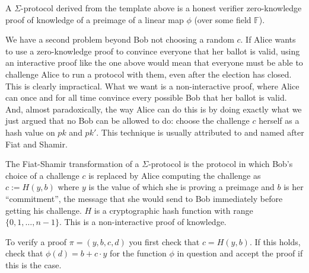 \documentclass[envcountsame]{llncs}
\begin{document}
\begin{proposition}
A $\Sigma$-protocol derived from the template above is a honest verifier zero-knowledge proof of knowledge of a preimage of a linear map $\phi$ (over
some field $\mathbb F$).
\end{proposition}


We have a second problem beyond Bob not choosing a random $c$. If Alice wants to
use a zero-knowledge proof to convince everyone that her ballot is valid, using
an interactive proof like the one above would mean that everyone must be able to
challenge Alice to run a protocol with them, even after the election has closed.
This is clearly impractical. What we want is a non-interactive proof, where
Alice can once and for all time convince every possible Bob that her ballot is
valid. And, almost paradoxically, the way Alice can do this is by doing exactly
what we just argued that no Bob can be allowed to do: choose the challenge $c$
herself as a hash value on $pk$ and $pk'$. This technique is usually attributed
to and named after Fiat and Shamir\footnotemark \cite{FS86}.

\begin{definition}
The Fiat-Shamir transformation of a $\Sigma$-protocol is the protocol in which
Bob's choice of a challenge $c$ is replaced by Alice computing the challenge as
$c := H(y, b)$ where $y$ is the value of which she is proving a preimage and $b$
is her ``commitment'', the message that she would send to Bob immediately before
getting his challenge. $H$ is a cryptographic hash function with range $\{0, 1,
\ldots, n-1\}$. This is a non-interactive proof of knowledge.

To verify a proof $\pi = (y, b, c, d)$ you first check that $c = H(y, b)$. If
this holds, check that $\phi(d) = b + c\cdot y$ for the function $\phi$ in
question and accept the proof if this is the case.
\end{definition}
\end{document}

